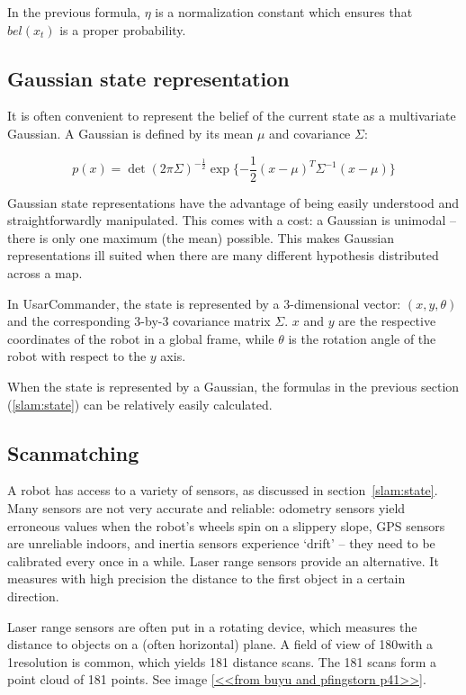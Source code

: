 In the previous formula, $\eta$ is a normalization constant which ensures that $bel(x_t)$ is a proper probability.

\subsection{Gaussian state representation}
It is often convenient to represent the belief of the current state as a multivariate Gaussian. A Gaussian is defined by its mean $\mu$ and covariance $\Sigma$:

\begin{equation}
p(x) = \det(2\pi\Sigma)^{-\frac{1}{2}}\exp{\{-\frac{1}{2}(x - \mu)^T\Sigma^{-1}(x - \mu)\}}
\end{equation}

Gaussian state representations have the advantage of being easily understood and straightforwardly manipulated. This comes with a cost: a Gaussian is unimodal -- there is only one maximum (the mean) possible. This makes Gaussian representations ill suited when there are many different hypothesis distributed across a map. 

In UsarCommander, the state is represented by a 3-dimensional vector: $(x, y, \theta)$ and the corresponding 3-by-3 covariance matrix $\Sigma$. $x$ and $y$ are the respective coordinates of the robot in a global frame, while $\theta$ is the rotation angle of the robot with respect to the $y$ axis.

When the state is represented by a Gaussian, the formulas in the previous section (\ref{slam:state}) can be relatively easily calculated.

\subsection{Scanmatching}
\label{scanmatching}
A robot has access to a variety of sensors, as discussed in section~\ref{slam:state}. Many sensors are not very accurate and reliable: odometry sensors yield erroneous values when the robot's wheels spin on a slippery slope, GPS sensors are unreliable indoors, and inertia sensors experience `drift' -- they need to be calibrated every once in a while. Laser range sensors provide an alternative. It measures with high precision the distance to the first object in a certain direction. 

Laser range sensors are often put in a rotating device, which measures the distance to objects on a (often horizontal) plane. A field of view of 180\degree with a 1\degree resolution is common, which yields 181 distance scans. The 181 scans form a point cloud of 181 points. See image \ref{<<from buyu and pfingstorn p41>>}. 

